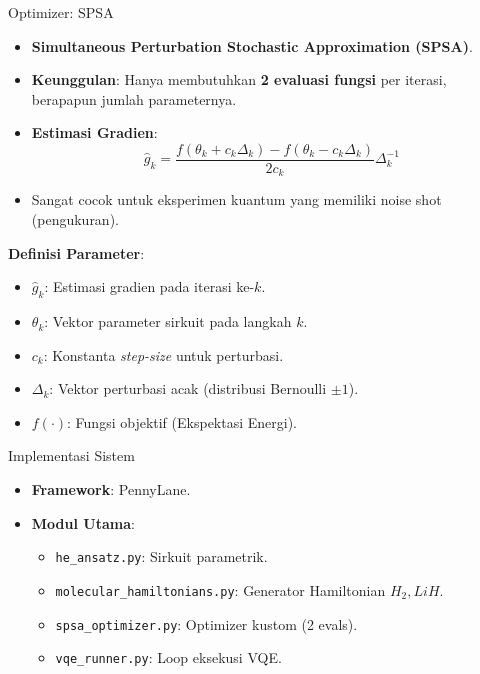 \documentclass{beamer}
\begin{document}
\begin{frame}{Optimizer: SPSA}
    \begin{itemize}
        \item \textbf{Simultaneous Perturbation Stochastic Approximation (SPSA)}.
        \item \textbf{Keunggulan}: Hanya membutuhkan \textbf{2 evaluasi fungsi} per iterasi, berapapun jumlah parameternya.
        \item \textbf{Estimasi Gradien}:
        \begin{equation}
            \hat{g}_k = \frac{f(\theta_k + c_k \Delta_k) - f(\theta_k - c_k \Delta_k)}{2 c_k} \Delta_k^{-1}
        \end{equation}
        \item Sangat cocok untuk eksperimen kuantum yang memiliki noise shot (pengukuran).
    \end{itemize}
    \vspace{0.3cm}
    \textbf{Definisi Parameter}:
    \footnotesize
    \begin{itemize}
        \item $\hat{g}_k$: Estimasi gradien pada iterasi ke-$k$.
        \item $\theta_k$: Vektor parameter sirkuit pada langkah $k$.
        \item $c_k$: Konstanta \textit{step-size} untuk perturbasi.
        \item $\Delta_k$: Vektor perturbasi acak (distribusi Bernoulli $\pm 1$).
        \item $f(\cdot)$: Fungsi objektif (Ekspektasi Energi).
    \end{itemize}
\end{frame}

\begin{frame}{Implementasi Sistem}
    \begin{itemize}
        \item \textbf{Framework}: PennyLane.
        \item \textbf{Modul Utama}:
        \begin{itemize}
            \item \texttt{he\_ansatz.py}: Sirkuit parametrik.
            \item \texttt{molecular\_hamiltonians.py}: Generator Hamiltonian $H_2, LiH$.
            \item \texttt{spsa\_optimizer.py}: Optimizer kustom (2 evals).
            \item \texttt{vqe\_runner.py}: Loop eksekusi VQE.
        \end{itemize}
    \end{itemize}
\end{frame}
\end{document}

